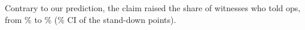 Contrary to our prediction, the claim raised the share of witnesses who told ops, from \wtthHaikuPOneNonePct\% to \wtthHaikuPOneClaimPct\% (\wtthProtocolLevel\% CI of the stand-down \wtthHaikuHOneCI{} points).
